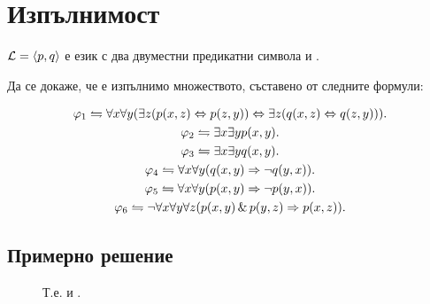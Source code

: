 \documentclass[12pt]{article}
\begin{document}
\newpage
\section{Изпълнимост}
\start ${\cal L}=\langle p, q\rangle$ е език с два двуместни предикатни символа   и .

Да се докаже, че е изпълнимо множеството, съставено от следните формули:

\begin{gather*}
    \varphi_1 \leftrightharpoons \forall x \forall y ( \exists z (p(x, z) \Leftrightarrow p(z, y)) \Leftrightarrow \exists z (q(x, z) \Leftrightarrow q(z, y))). \\
    \varphi_2 \leftrightharpoons \exists x \exists y p(x, y). \\
    \varphi_3 \leftrightharpoons \exists x \exists y q(x, y). \\
    \varphi_4 \leftrightharpoons \forall x \forall y (q(x, y) \Rightarrow \neg q(y, x)). \\
    \varphi_5 \leftrightharpoons \forall x \forall y (p(x, y) \Rightarrow \neg p(y, x)). \\
    \varphi_6 \leftrightharpoons \neg \forall x \forall y \forall z (p(x,y)\,\&\, p(y, z) \Rightarrow p(x, z)).
\end{gather*}

\subsection{Примерно решение}
\begin{figure}[H]
    \begin{center}
        \nl
        Т.е.  и .
    \end{center}
\end{figure}
\end{document}
